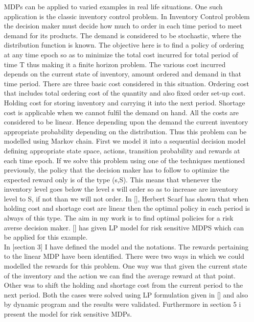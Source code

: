 \documentclass[10pt,a4paper,oneside]{report}
\begin{document}
\noindent MDPs can be applied to varied examples in real life situations. One such application is the classic inventory control problem. In Inventory Control problem the decision maker must decide how much to order in each time period to meet demand for its products. The demand  is considered to be stochastic, where the distribution function is known. The objective here is to find a policy of ordering at any time epoch so as to minimize the total cost incurred for total period of time T thus making it a finite horizon problem. The various cost incurred depends on the current state of inventory, amount ordered and demand in that time period. There are three basic cost considered in this situation. Ordering cost that includes total  ordering cost of the quantity and also fixed order set-up cost. Holding cost for storing inventory and carrying it into the next period. Shortage cost is applicable when we cannot fulfil the demand on hand. All the costs are considered to be linear. Hence depending upon the demand the current inventory appropriate probability depending on the distribution. Thus this problem can be modelled using Markov chain. First we model it into a sequential decision model defining appropriate state space, actions, transition probability and rewards at each time epoch.  If we solve this problem using one of the techniques mentioned previously, the policy that the decision maker has to follow to optimize the expected reward only  is of the type (s,S). This means that whenever the inventory level goes below the level s will order so as to increase are inventory level to S, if not than we will not order. In [], Herbert Scarf has shown that when holding cost and shortage cost are linear then the optimal policy in each period is always of this type. The aim in my work is to find optimal policies for a risk averse decision maker. [] has given LP model for risk sensitive MDPS which can be applied for this example. \\

In [section 3] I have defined the model and the notations. The rewards pertaining to the linear MDP have been identified. There were two ways in which we could modelled the rewards for this problem. One way was that given the current state of the inventory and the action we can find the average reward at that point. Other was to shift the holding and shortage cost from the current period to the next period. Both the cases were solved using LP formulation given in [] and also by dynamic program and the results were validated. Furthermore in section 5 i present the model for risk sensitive MDPs.
\end{document}
